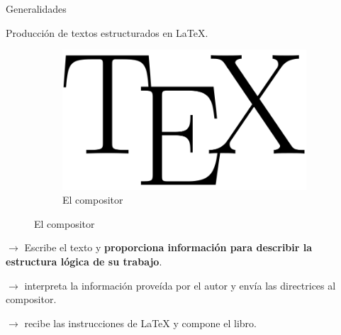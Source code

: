 \documentclass[10pt]{beamer}
\begin{document}
\begin{frame}{Generalidades}
\begin{block}{Producción de textos estructurados en \LaTeX{}.}
\begin{multicols}{2}
\begin{figure}
			\begin{subfigure}[b]{0.5\textwidth} 
				\centering
				\includegraphics[scale=.06]{figures/compositor_LaTeX}
				\caption{El compositor}
			\end{subfigure}
		\end{figure}	
\newpage

\vspace*{.05cm}
$\rightarrow$ Escribe el texto y \textbf{proporciona información para describir la estructura lógica de su trabajo}.


\vspace*{.70cm}
$\rightarrow$ interpreta la información proveída por el autor y envía las directrices al compositor.

\vspace*{.90cm}
$\rightarrow$ recibe las instrucciones de \LaTeX{} y compone el libro.
\end{multicols}
	\end{block}
\end{frame}
\end{document}
